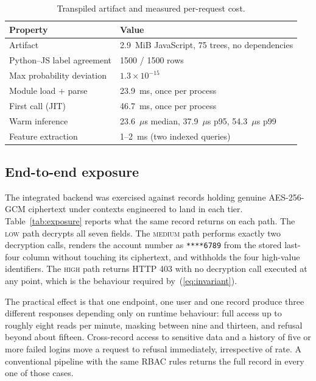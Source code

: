 \documentclass[a4paper,conference]{IEEEtran}
\newcommand{\HIGH}{\textsc{high}}
\newcommand{\MED}{\textsc{medium}}
\newcommand{\LOW}{\textsc{low}}
\begin{document}
\begin{table}[t]
\caption{Transpiled artifact and measured per-request cost.}
\label{tab:runtime}
\centering
\footnotesize
\begin{tabular}{@{}ll@{}}
\toprule
Property & Value \\
\midrule
Artifact & 2.9~MiB JavaScript, 75 trees, no dependencies \\
Python--JS label agreement & 1500 / 1500 rows \\
Max probability deviation & $1.3\times10^{-15}$ \\
Module load + parse & 23.9~ms, once per process \\
First call (JIT) & 46.7~ms, once per process \\
Warm inference & 23.6~$\mu$s median, 37.9~$\mu$s p95, 54.3~$\mu$s p99 \\
Feature extraction & 1--2~ms (two indexed queries) \\
\bottomrule
\end{tabular}
\end{table}

\subsection{End-to-end exposure}

The integrated backend was exercised against records holding genuine AES-256-GCM ciphertext under
contexts engineered to land in each tier. Table~\ref{tab:exposure} reports what the same record
returns on each path. The \LOW{} path decrypts all seven fields. The \MED{} path performs exactly
two decryption calls, renders the account number as \texttt{****6789} from the stored last-four
column without touching its ciphertext, and withholds the four high-value identifiers. The
\HIGH{} path returns HTTP 403 with no decryption call executed at any point, which is the
behaviour required by~(\ref{eq:invariant}).

The practical effect is that one endpoint, one user and one record produce three different
responses depending only on runtime behaviour: full access up to roughly eight reads per minute,
masking between nine and thirteen, and refusal beyond about fifteen. Cross-record access to
sensitive data and a history of five or more failed logins move a request to refusal immediately,
irrespective of rate. A conventional pipeline with the same RBAC rules returns the full record in
every one of those cases.
\end{document}
